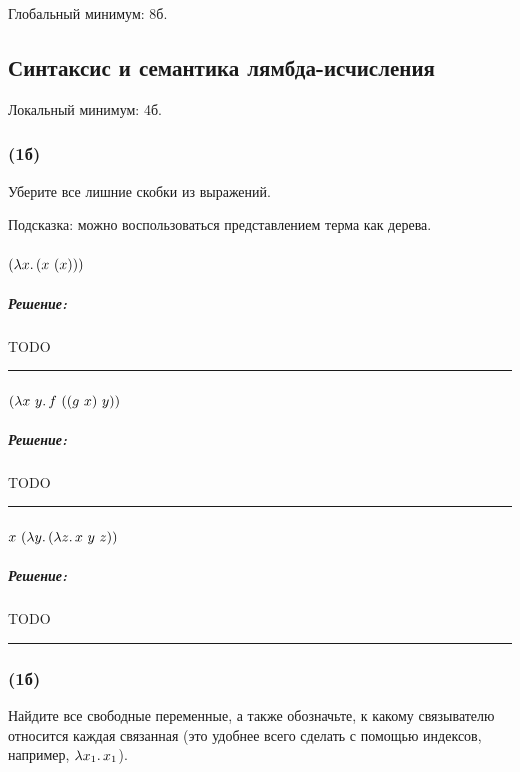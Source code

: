 \documentclass{article}
\newenvironment{proof}{\subparagraph{\hspace{-1em}Решение:\newline}}{\par\noindent\rule{\textwidth}{0.4pt}}
\begin{document}
    Глобальный минимум: 8б.

    \subsection{Синтаксис и семантика лямбда-исчисления}

    Локальный минимум: 4б.

    \subsubsection{(1б)}

    Уберите все лишние скобки из выражений.

    Подсказка: можно воспользоваться представлением терма как дерева.

    \paragraph{}

    $(\lambda x\ldotp (x~(x)))$

    \begin{proof}
        TODO %
    \end{proof}

    \paragraph{}

    $(\lambda x~y \ldotp f~((g~x)~y))$

    \begin{proof}
        TODO %
    \end{proof}

    \paragraph{}

    $x ~ (\lambda y\ldotp (\lambda z \ldotp x~y~z))$

    \begin{proof}
        TODO %
    \end{proof}

    \subsubsection{(1б)}

    Найдите все свободные переменные, а также обозначьте, к какому связывателю относится каждая связанная (это удобнее всего сделать с помощью индексов, например, $\lambda x_1\ldotp x_1$).
\end{document}
